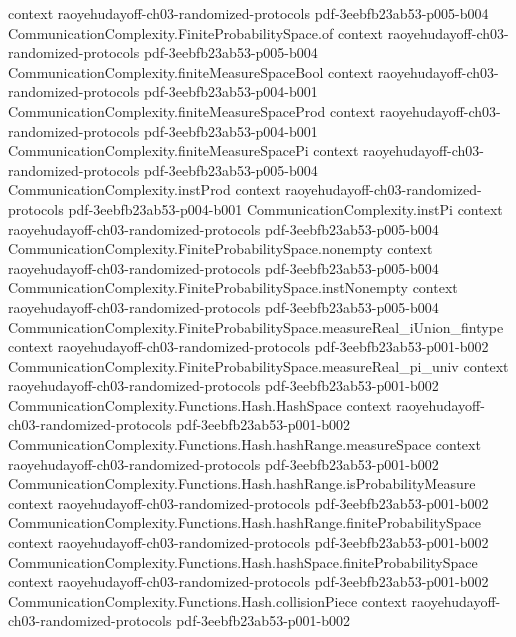 \begin{theorem}
  {context}
  {raoyehudayoff-ch03-randomized-protocols}
  {pdf-3eebfb23ab53-p005-b004}
\proofstep
  {CommunicationComplexity.FiniteProbabilitySpace.of}
  {context}
  {raoyehudayoff-ch03-randomized-protocols}
  {pdf-3eebfb23ab53-p005-b004}
\proofstep
  {CommunicationComplexity.finiteMeasureSpaceBool}
  {context}
  {raoyehudayoff-ch03-randomized-protocols}
  {pdf-3eebfb23ab53-p004-b001}
\proofstep
  {CommunicationComplexity.finiteMeasureSpaceProd}
  {context}
  {raoyehudayoff-ch03-randomized-protocols}
  {pdf-3eebfb23ab53-p004-b001}
\proofstep
  {CommunicationComplexity.finiteMeasureSpacePi}
  {context}
  {raoyehudayoff-ch03-randomized-protocols}
  {pdf-3eebfb23ab53-p005-b004}
\proofstep
  {CommunicationComplexity.instProd}
  {context}
  {raoyehudayoff-ch03-randomized-protocols}
  {pdf-3eebfb23ab53-p004-b001}
\proofstep
  {CommunicationComplexity.instPi}
  {context}
  {raoyehudayoff-ch03-randomized-protocols}
  {pdf-3eebfb23ab53-p005-b004}
\proofstep
  {CommunicationComplexity.FiniteProbabilitySpace.nonempty}
  {context}
  {raoyehudayoff-ch03-randomized-protocols}
  {pdf-3eebfb23ab53-p005-b004}
\proofstep
  {CommunicationComplexity.FiniteProbabilitySpace.instNonempty}
  {context}
  {raoyehudayoff-ch03-randomized-protocols}
  {pdf-3eebfb23ab53-p005-b004}
\proofstep
  {CommunicationComplexity.FiniteProbabilitySpace.measureReal_iUnion_fintype}
  {context}
  {raoyehudayoff-ch03-randomized-protocols}
  {pdf-3eebfb23ab53-p001-b002}
\proofstep
  {CommunicationComplexity.FiniteProbabilitySpace.measureReal_pi_univ}
  {context}
  {raoyehudayoff-ch03-randomized-protocols}
  {pdf-3eebfb23ab53-p001-b002}
\proofstep
  {CommunicationComplexity.Functions.Hash.HashSpace}
  {context}
  {raoyehudayoff-ch03-randomized-protocols}
  {pdf-3eebfb23ab53-p001-b002}
\proofstep
  {CommunicationComplexity.Functions.Hash.hashRange.measureSpace}
  {context}
  {raoyehudayoff-ch03-randomized-protocols}
  {pdf-3eebfb23ab53-p001-b002}
\proofstep
  {CommunicationComplexity.Functions.Hash.hashRange.isProbabilityMeasure}
  {context}
  {raoyehudayoff-ch03-randomized-protocols}
  {pdf-3eebfb23ab53-p001-b002}
\proofstep
  {CommunicationComplexity.Functions.Hash.hashRange.finiteProbabilitySpace}
  {context}
  {raoyehudayoff-ch03-randomized-protocols}
  {pdf-3eebfb23ab53-p001-b002}
\proofstep
  {CommunicationComplexity.Functions.Hash.hashSpace.finiteProbabilitySpace}
  {context}
  {raoyehudayoff-ch03-randomized-protocols}
  {pdf-3eebfb23ab53-p001-b002}
\proofstep
  {CommunicationComplexity.Functions.Hash.collisionPiece}
  {context}
  {raoyehudayoff-ch03-randomized-protocols}
  {pdf-3eebfb23ab53-p001-b002}

\end{theorem}
